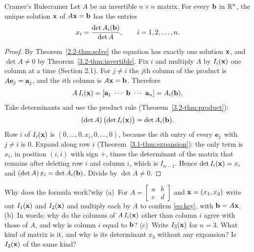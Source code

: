 \documentclass[11pt]{article}
\begin{document}
\begin{thm}{Cramer's Rule}{cramer}
Let $A$ be an invertible $n\times n$ matrix. For every $\mathbf{b}$ in $\mathbb{R}^n$, the unique solution $\mathbf{x}$ of $A\mathbf{x}=\mathbf{b}$ has the entries
\[
x_i=\frac{\det A_i(\mathbf{b})}{\det A},\qquad i=1,2,\dots,n.
\]
\end{thm}

\begin{proof}
By Theorem~\ref{2.2-thm:solve} the equation has exactly one solution $\mathbf{x}$, and $\det A\neq0$ by Theorem~\ref{3.2-thm:invertible}. Fix $i$ and multiply $A$ by $I_i(\mathbf{x})$ one column at a time (Section 2.1). For $j\neq i$ the $j$th column of the product is $A\mathbf{e}_j=\mathbf{a}_j$, and the $i$th column is $A\mathbf{x}=\mathbf{b}$. Therefore
\begin{equation}\label{eq:key}
A\,I_i(\bv{x})=[\bv{a}_1\ \cdots\ \bv{b}\ \cdots\ \bv{a}_n]=A_i(\bv{b}).
\end{equation}
Take determinants and use the product rule (Theorem~\ref{3.2-thm:product}):
\[
(\det A)\,\bigl(\det I_i(\mathbf{x})\bigr)=\det A_i(\mathbf{b}).
\]
Row $i$ of $I_i(\mathbf{x})$ is $(0,\dots,0,x_i,0,\dots,0)$, because the $i$th entry of every $\mathbf{e}_j$ with $j\neq i$ is $0$. Expand along row $i$ (Theorem~\ref{3.1-thm:expansion}): the only term is $x_i$, in position $(i,i)$ with sign $+$, times the determinant of the matrix that remains after deleting row $i$ and column $i$, which is $I_{n-1}$. Hence $\det I_i(\mathbf{x})=x_i$ and $(\det A)\,x_i=\det A_i(\mathbf{b})$. Divide by $\det A\neq0$.
\end{proof}

\begin{think}{Why does the formula work?}{why}
(a)~For $A=\begin{bmatrix}a&b\\c&d\end{bmatrix}$ and $\mathbf{x}=(x_1,x_2)$ write out $I_1(\mathbf{x})$ and $I_2(\mathbf{x})$ and multiply each by $A$ to confirm \eqref{eq:key}, with $\mathbf{b}=A\mathbf{x}$. (b)~In words: why do the columns of $A\,I_i(\mathbf{x})$ other than column $i$ agree with those of $A$, and why is column $i$ equal to $\mathbf{b}$? (c)~Write $I_3(\mathbf{x})$ for $n=3$. What kind of matrix is it, and why is its determinant $x_3$ without any expansion? Is $I_2(\mathbf{x})$ of the same kind?
\end{think}
\end{document}
